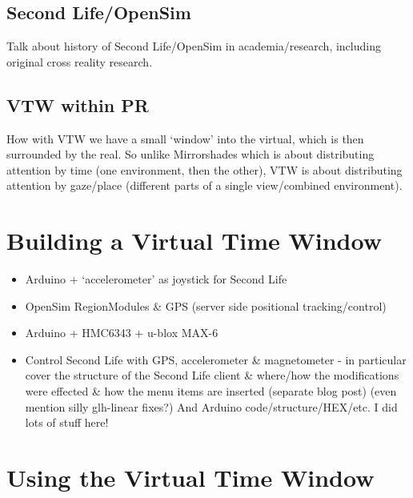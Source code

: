 \subsection{Second Life/OpenSim}

Talk about history of Second Life/OpenSim in academia/research, including original cross reality research.

\subsection{VTW within PR}

How with VTW we have a small `window' into the virtual, which is then surrounded by the real. So unlike Mirrorshades which is about distributing attention by time (one environment, then the other), VTW is about distributing attention by gaze/place (different parts of a single view/combined environment).


\section{Building a Virtual Time Window}

\begin{itemize}
	\item Arduino + `accelerometer' as joystick for Second Life
	\item OpenSim RegionModules \& GPS (server side positional tracking/control)
	\item Arduino + HMC6343 + u-blox MAX-6
	\item Control Second Life with GPS, accelerometer \& magnetometer - in particular cover the structure of the Second Life client \& where/how the modifications were effected \& how the menu items are inserted (separate blog post) (even mention silly glh-linear fixes?) And Arduino code/structure/HEX/etc. I did lots of stuff here!
\end{itemize}


\section{Using the Virtual Time Window}














